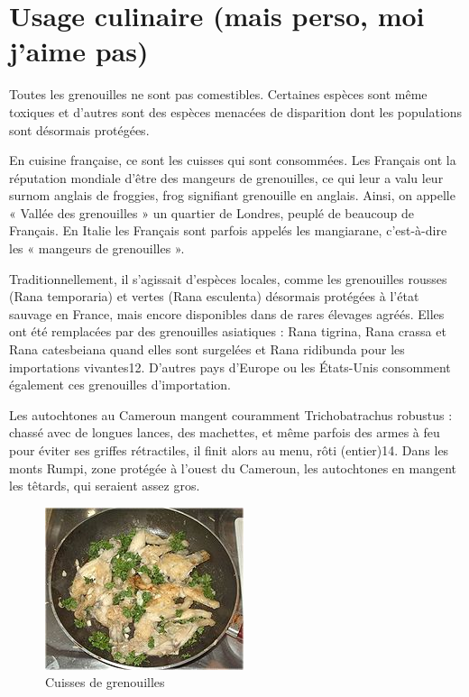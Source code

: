 \section{Usage culinaire (mais perso, moi j'aime pas)}

Toutes les grenouilles ne sont pas comestibles. Certaines espèces sont même toxiques et d'autres sont des espèces menacées de disparition dont les populations sont désormais protégées.

En cuisine française, ce sont les cuisses qui sont consommées. Les Français ont la réputation mondiale d'être des mangeurs de grenouilles, ce qui leur a valu leur surnom anglais de froggies, frog signifiant grenouille en anglais. Ainsi, on appelle « Vallée des grenouilles » un quartier de Londres, peuplé de beaucoup de Français.
En Italie les Français sont parfois appelés les mangiarane, c'est-à-dire les « mangeurs de grenouilles ».

Traditionnellement, il s'agissait d'espèces locales, comme les grenouilles rousses (Rana temporaria) et vertes (Rana esculenta) désormais protégées à l'état sauvage en France, mais encore disponibles dans de rares élevages agréés. Elles ont été remplacées par des grenouilles asiatiques : Rana tigrina, Rana crassa et Rana catesbeiana quand elles sont surgelées et Rana ridibunda pour les importations vivantes12. D'autres pays d'Europe ou les États-Unis consomment également ces grenouilles d'importation.

Les autochtones au Cameroun mangent couramment Trichobatrachus robustus : chassé avec de longues lances, des machettes, et même parfois des armes à feu pour éviter ses griffes rétractiles, il finit alors au menu, rôti (entier)14. Dans les monts Rumpi, zone protégée à l'ouest du Cameroun, les autochtones en mangent les têtards, qui seraient assez gros.

\begin{figure}
\begin{center}
\includegraphics[width = .5\textwidth]{cuisine/miam.jpg}
\end{center}
\caption{Cuisses de grenouilles}
\label{fig:gre}
\end{figure}